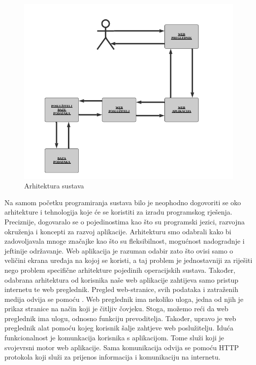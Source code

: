 	\begin{figure}[H]
			\includegraphics[scale=1.0]{slike/arh.PNG} %
			\centering
			\caption{Arhitektura sustava}
			\label{fig:promjene}
		\end{figure}
	Na samom početku programiranja sustava bilo je neophodno dogovoriti se oko arhitekture i tehnologija koje će se koristiti za izradu programskog rješenja. Preciznije, dogovaralo se o pojedinostima kao što su programski jezici, razvojna okruženja i koncepti za razvoj aplikacije. Arhitekturu smo odabrali kako bi zadovoljavala mnoge značajke kao što su fleksibilnost, mogućnost nadogradnje i jeftinije održavanje. Web aplikacija je razuman odabir zato što ovisi samo o veličini ekrana uređaja na kojoj se koristi, a taj problem je jednostavniji za riješiti nego problem specifične arhitekture pojedinih operacijskih sustava. Također, odabrana arhitektura od korisnika naše web aplikacije zahtijeva samo pristup internetu te web preglednik.  \newline
	\indent Pregled web-stranice, svih podataka i zatraženih medija odvija se pomoću . Web preglednik ima nekoliko uloga, jedna od njih je prikaz stranice na način koji je čitljiv čovjeku. Stoga, možemo reći da web preglednik ima ulogu, odnosno funkciju prevoditelja. Također, upravo je web preglednik alat pomoću kojeg korisnik šalje zahtjeve web poslužitelju. \newline
	\indent Iduća funkcionalnost je komunkacija korisnika s aplikacijom. Tome služi  koji je svojevrsni motor web aplikacije. Sama komunikacija odvija se pomoću HTTP protokola koji služi za prijenos informacija i komunikaciju na internetu. \newline
